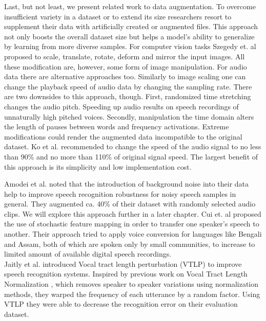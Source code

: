 Last, but not least, we present related work to data augmentation. To overcome insufficient variety in a dataset or to extend its size researchers resort to supplement their data with artificially created or augmented files. This approach not only boosts the overall dataset size but helps a model's ability to generalize by learning from more diverse samples. For computer vision tasks Szegedy et. al\cite{szegedy2015going} proposed to scale, translate, rotate, deform and mirror the input images. All these modification are, however, some form of image manipulation. For audio data there are alternative approaches too. Similarly to image scaling one can change the playback speed of audio data by changing the sampling rate. There are two downsides to this approach, though. First, randomized time stretching changes the audio pitch. Speeding up audio results on speech recordings of unnaturally high pitched voices. Secondly, manipulation the time domain alters the length of pauses between words and frequency activations. Extreme modifications could render the augmented data incompatible to the original dataset. Ko et al.\cite{ko2015audio}  recommended to change the speed of the audio signal to no less than 90\% and no more than 110\% of original signal speed. The largest benefit of this approach is its simplicity and low implementation cost.

Amodei et al.\cite{amodei2015deep} noted that the introduction of background noise into their data help to improve speech recognition robustness for noisy speech samples in general. They augmented ca. 40\% of their dataset with randomly selected audio clips. We will explore this approach further in a later chapter. Cui et. al\cite{cui2015data} proposed the use of stochastic feature mapping in order to transfer one speaker's speech to another. Their approach tried to apply voice conversion for languages like Bengali and Assam, both of which are spoken only by small communities, to increase to limited amount of available digital speech recordings.\\ 
Jaitly et al.\cite{jaitly2013vocal} introduced Vocal tract length perturbation (VTLP) to improve speech recognition systems. Inspired by previous work on Vocal Tract Length Normalization \cite{eide1996parametric}, which removes speaker to speaker variations using normalization methods, they warped the frequency of each utterance by a random factor. Using VTLP they were able to decrease the recognition error on their evaluation dataset.

       